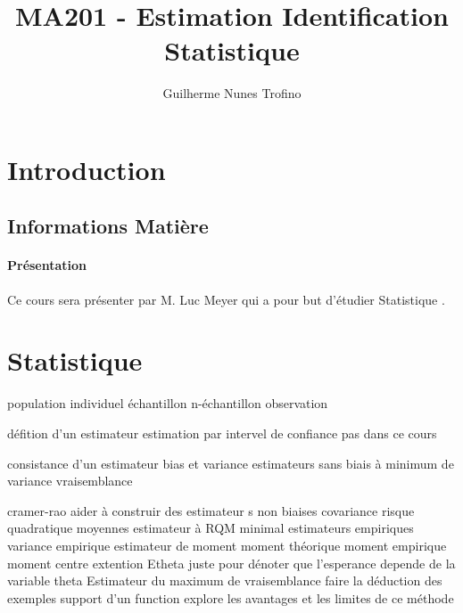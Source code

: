 \documentclass{article}
\title{MA201 - Estimation Identification Statistique}
\author{Guilherme Nunes Trofino}
\begin{document}
\maketitle

\newpage\tableofcontents

\section{Introduction}



\subsection{Informations Matière}
\paragraph{Présentation}Ce cours sera présenter par M. Luc Meyer qui a pour but d'étudier Statistique .


\section{Statistique}
population
individuel
échantillon
n-échantillon
observation

défition d'un estimateur
estimation par intervel de confiance pas dans ce cours

consistance d'un estimateur
bias et variance
estimateurs sans biais à minimum de variance
vraisemblance

cramer-rao
aider à construir des estimateur s non biaises
covariance
risque quadratique moyennes
estimateur à RQM minimal
estimateurs empiriques
variance empirique
estimateur de moment
moment théorique
moment empirique
moment centre
extention
Etheta juste pour dénoter que l'esperance depende de la variable theta
Estimateur du maximum de vraisemblance
faire la déduction des exemples
support d'un function
explore les avantages et les limites de ce méthode

\end{document}
